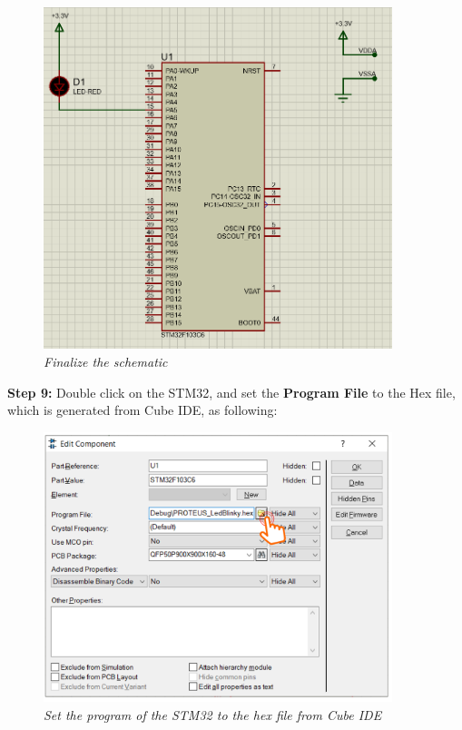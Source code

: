 \begin{figure}[!htp]
    \centering
    \includegraphics[width=4in]{source/picture/bai_1/pic17.PNG}
    \caption{\textit{Finalize the schematic}}
    \label{bai1_pic17}
\end{figure}
\newpage
\textbf{Step 9: } Double click on the STM32, and set the \textbf{Program File} to the Hex file, which is generated from Cube IDE, as following:

\begin{figure}[!htp]
    \centering
    \includegraphics[width=4in]{source/picture/bai_1/pic18.PNG}
    \caption{\textit{Set the program of the STM32 to the hex file from Cube IDE}}
    \label{bai1_pic18}
\end{figure}

